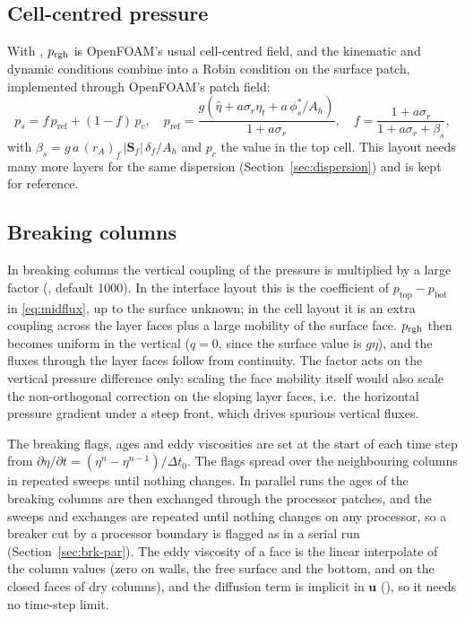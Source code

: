 \subsection{Cell-centred pressure}
\label{sec:cellp}

With , $p_{\mathrm{rgh}}$ is OpenFOAM's usual cell-centred
field, and the kinematic and dynamic conditions combine into a Robin condition
on the surface patch, implemented through OpenFOAM's  patch field:
\begin{equation}
  p_s = f\,p_{\mathrm{ref}} + (1-f)\,p_c,\quad
  p_{\mathrm{ref}} = \frac{g\left(\hat\eta + a\sigma_r\eta_t + a\,\phi^{*}_s/A_h\right)}{1 + a\sigma_r},\quad
  f = \frac{1 + a\sigma_r}{1 + a\sigma_r + \beta_s},
  \label{eq:robin}
\end{equation}
with $\beta_s = g\,a\,(r_A)_f\,|\bm{S}_f|\,\delta_f/A_h$ and $p_c$ the value in the
top cell. This layout needs many more layers for the same dispersion
(Section~\ref{sec:dispersion}) and is kept for reference.

\subsection{Breaking columns}
\label{sec:numhfa}

In breaking columns the vertical coupling of the pressure is multiplied by a
large factor (, default 1000). In the interface layout
this is the coefficient of $p_{\mathrm{top}}-p_{\mathrm{bot}}$ in
\eqref{eq:midflux}, up to the surface unknown; in the cell layout it is an
extra coupling across the layer faces plus a large mobility of the surface
face. $p_{\mathrm{rgh}}$ then becomes uniform in the vertical ($q=0$, since the surface
value is $g\eta$), and the fluxes through the layer faces follow from
continuity. The factor acts on the vertical pressure difference only: scaling
the face mobility itself would also scale the non-orthogonal correction on the
sloping layer faces, i.e.\ the horizontal pressure gradient under a steep
front, which drives spurious vertical fluxes.

The breaking flags, ages and eddy viscosities are set at the start of each
time step from $\partial\eta/\partial t = (\eta^n-\eta^{n-1})/\Delta t_0$.
The flags spread over the neighbouring columns in repeated sweeps until
nothing changes. In parallel runs the ages of the breaking columns are then
exchanged through the processor patches, and the sweeps and exchanges are
repeated until nothing changes on any processor, so a breaker cut by a
processor boundary is flagged as in a serial run (Section~\ref{sec:brk-par}). The
eddy viscosity of a face is the linear interpolate of the column values
(zero on walls, the free surface and the bottom, and on the closed faces of
dry columns), and the diffusion term is implicit in $\bm{u}$
(), so it needs no time-step limit.

